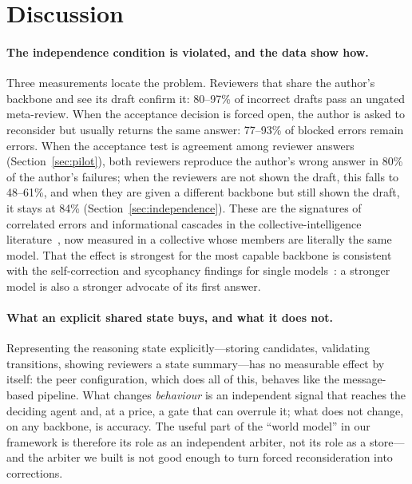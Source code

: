 \documentclass[manuscript, screen, review]{acmart}
\begin{document}
\section{Discussion}
\label{sec:discussion}

\paragraph{The independence condition is violated, and the data show how.}
Three measurements locate the problem.
Reviewers that share the author's backbone and see its draft confirm it: 80--97\% of incorrect drafts pass an ungated meta-review.
When the acceptance decision is forced open, the author is asked to reconsider but usually returns the same answer: 77--93\% of blocked errors remain errors.
When the acceptance test is agreement among reviewer answers (Section~\ref{sec:pilot}), both reviewers reproduce the author's wrong answer in 80\% of the author's failures; when the reviewers are not shown the draft, this falls to 48--61\%, and when they are given a different backbone but still shown the draft, it stays at 84\% (Section~\ref{sec:independence}).
These are the signatures of correlated errors and informational cascades in the collective-intelligence literature~\cite{ladha1992condorcet,bikhchandani1992cascades,lorenz2011social}, now measured in a collective whose members are literally the same model.
That the effect is strongest for the most capable backbone is consistent with the self-correction and sycophancy findings for single models~\cite{huang2024cannot,sharma2024sycophancy}: a stronger model is also a stronger advocate of its first answer.

\paragraph{What an explicit shared state buys, and what it does not.}
Representing the reasoning state explicitly---storing candidates, validating transitions, showing reviewers a state summary---has no measurable effect by itself: the peer configuration, which does all of this, behaves like the message-based pipeline.
What changes \emph{behaviour} is an independent signal that reaches the deciding agent and, at a price, a gate that can overrule it; what does not change, on any backbone, is accuracy.
The useful part of the ``world model'' in our framework is therefore its role as an independent arbiter, not its role as a store---and the arbiter we built is not good enough to turn forced reconsideration into corrections.
\end{document}
